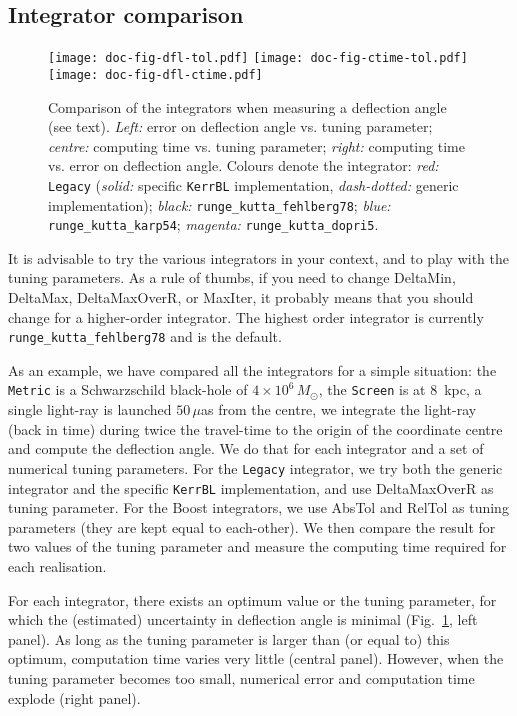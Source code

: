 \documentclass[a4paper,12pt]{article}
\begin{document}
\subsection{Integrator comparison}

\begin{figure}
  \texttt{[image: doc-fig-dfl-tol.pdf]}
  \texttt{[image: doc-fig-ctime-tol.pdf]}
  \texttt{[image: doc-fig-dfl-ctime.pdf]}
  \caption{Comparison of the integrators when measuring a deflection
    angle (see text). \emph{Left:} error on deflection angle
    vs. tuning parameter; \emph{centre:} computing time vs. tuning
    parameter; \emph{right:} computing time vs. error on deflection
    angle. Colours denote the integrator: \emph{red:} \texttt{Legacy}
    (\emph{solid:} specific \texttt{KerrBL} implementation,
    \emph{dash-dotted:} generic implementation); \emph{black:}
    \texttt{runge\_kutta\_fehlberg78}; \emph{blue:}
    \texttt{runge\_kutta\_karp54}; \emph{magenta:}
    \texttt{runge\_kutta\_dopri5}.}
\label{fig:integrators}
\end{figure}

It is advisable to try the various integrators in your context, and to
play with the tuning parameters. As a rule of thumbs, if you need to
change DeltaMin, DeltaMax, DeltaMaxOverR, or MaxIter, it probably
means that you should change for a higher-order integrator. The
highest order integrator is currently
\texttt{runge\_kutta\_fehlberg78} and is the default.

As an example, we have compared all the integrators for a simple
situation: the \texttt{Metric} is a Schwarzschild black-hole of
$4\times10^6\,M_\odot$, the \texttt{Screen} is at 8~kpc, a single
light-ray is launched $50\,\mu$as from the centre, we integrate the
light-ray (back in time) during twice the travel-time to the origin of
the coordinate centre and compute the deflection angle. We do that for
each integrator and a set of numerical tuning parameters. For the
\texttt{Legacy} integrator, we try both the generic integrator and the
specific \texttt{KerrBL} implementation, and use DeltaMaxOverR as
tuning parameter. For the Boost integrators, we use AbsTol and RelTol
as tuning parameters (they are kept equal to each-other). We then
compare the result for two values of the tuning parameter and measure
the computing time required for each
realisation.

For each integrator, there exists an optimum value or the tuning
parameter, for which the (estimated) uncertainty in deflection angle
is minimal (Fig.~\ref{fig:integrators}, left panel). As long as the
tuning parameter is larger than (or equal to) this optimum,
computation time varies very little (central panel). However, when the
tuning parameter becomes too small, numerical error and computation
time explode (right panel).
\end{document}

